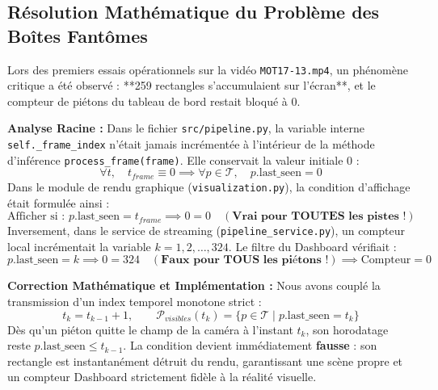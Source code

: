 \documentclass[11pt,a4paper]{article}
\begin{document}
\subsection{Résolution Mathématique du Problème des Boîtes Fantômes}
Lors des premiers essais opérationnels sur la vidéo \texttt{MOT17-13.mp4}, un phénomène critique a été observé : **259 rectangles s'accumulaient sur l'écran**, et le compteur de piétons du tableau de bord restait bloqué à $0$.

\begin{tcolorbox}[colback=red!5, colframe=red!70!black, title=Diagnostic de la Dérive Temporelle des Boîtes Fantômes]
\textbf{Analyse Racine :}
Dans le fichier \texttt{src/pipeline.py}, la variable interne \texttt{self.\_frame\_index} n'était jamais incrémentée à l'intérieur de la méthode d'inférence \texttt{process\_frame(frame)}. Elle conservait la valeur initiale $0$ :
\begin{equation}
    \forall t, \quad t_{frame} \equiv 0 \implies \forall p \in \mathcal{T}, \quad p.\text{last\_seen} = 0
\end{equation}
Dans le module de rendu graphique (\texttt{visualization.py}), la condition d'affichage était formulée ainsi :
\begin{equation}
    \text{Afficher si : } p.\text{last\_seen} = t_{frame} \implies 0 = 0 \quad (\textbf{Vrai pour TOUTES les pistes !})
\end{equation}
Inversement, dans le service de streaming (\texttt{pipeline\_service.py}), un compteur local incrémentait la variable $k = 1, 2, \dots, 324$. Le filtre du Dashboard vérifiait :
\begin{equation}
    p.\text{last\_seen} = k \implies 0 = 324 \quad (\textbf{Faux pour TOUS les piétons !}) \implies \text{Compteur} = 0
\end{equation}
\end{tcolorbox}

\textbf{Correction Mathématique et Implémentation :}
Nous avons couplé la transmission d'un index temporel monotone strict :
\begin{equation}
    t_k = t_{k-1} + 1, \qquad \mathcal{P}_{visibles}(t_k) = \{ p \in \mathcal{T} \mid p.\text{last\_seen} = t_k \}
\end{equation}
Dès qu'un piéton quitte le champ de la caméra à l'instant $t_k$, son horodatage reste $p.\text{last\_seen} \le t_{k-1}$. La condition devient immédiatement \textbf{fausse} : son rectangle est instantanément détruit du rendu, garantissant une scène propre et un compteur Dashboard strictement fidèle à la réalité visuelle.
\end{document}
